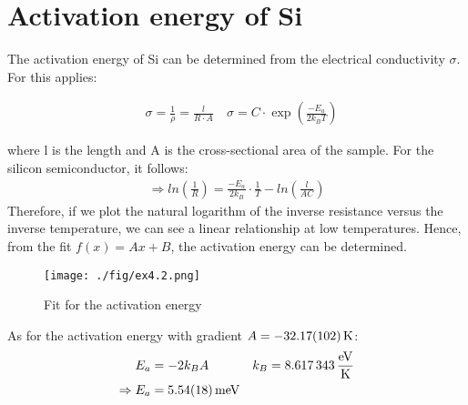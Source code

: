 
\section{Activation energy of Si}
The activation energy of Si can be determined from the electrical conductivity $\sigma$. For this applies:

\begin{align}
    &\sigma = \frac{1}{\rho} = \frac{l}{R\cdot A} \
    &\sigma = C\cdot \exp \left (\frac{-E_a}{2k_BT} \right ) 
\end{align}

where l is the length and A is the cross-sectional area of the sample. For the silicon semiconductor, it follows:
\begin{align}
    \Rightarrow ln\left( \frac{1}{R}\right ) = \frac{-E_a}{2k_B} \cdot \frac{1}{T} -ln \left ( \frac{l}{AC} \right )
\end{align}
Therefore, if we plot the natural logarithm of the inverse resistance versus the inverse temperature, we can see a linear relationship at low temperatures. Hence, from the fit $f(x) = Ax+B $, the activation energy can be determined. 
\begin{figure}
    \centering
    \texttt{[image: ./fig/ex4.2.png]}
    \caption{Fit for the activation energy}
    \label{fig:E_activation}
\end{figure}
As for the activation energy with gradient $A = \SI{-32,17\pm1,02}{K}$:
\begin{align}
    E_a &= -2k_BA &k_B = \SI{8,617343}{\frac{eV}{K}} \\
    \Rightarrow E_a &= \SI{5,54\pm 0,18}{meV}
\end{align}